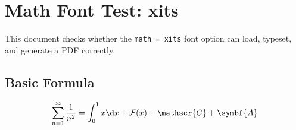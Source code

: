 \documentclass[lang = en, math = xits, font = none, mode = simple]{elegantbook-l3}
\begin{document}
\frontmatter
\tableofcontents

\mainmatter
\chapter{Math Font Test: xits}

This document checks whether the \texttt{math = xits} font option can load,
typeset, and generate a PDF correctly.

\section{Basic Formula}

\[
  \sum_{n=1}^{\infty} \frac{1}{n^2}
  =
  \int_0^1 x\d x + \mathcal{F}(x) + \mathscr{G} + \symbf{A}
\]
\end{document}

